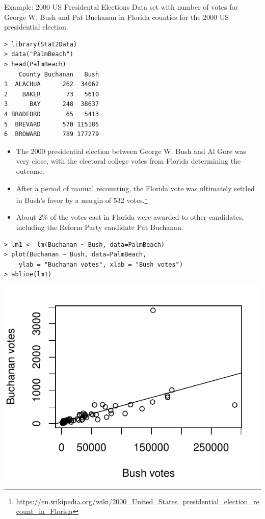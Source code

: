 \documentclass[10pt]{beamer}
\begin{document}
\begin{frame}[fragile]{Example: 2000 US Presidental Elections}
Data set with number of votes for George W. Bush and Pat Buchanan in Florida counties for the 2000 US presidential election.\\
\begin{verbatim}
> library(Stat2Data)
> data("PalmBeach")
> head(PalmBeach)
    County Buchanan   Bush
1  ALACHUA      262  34062
2    BAKER       73   5610
3      BAY      248  38637
4 BRADFORD       65   5413
5  BREVARD      570 115185
6  BROWARD      789 177279
\end{verbatim}
\end{frame}

\begin{frame}
\begin{itemize}
\item The 2000 presidential election between George W. Bush and Al Gore was very close, with the electoral college votes from Florida determining the outcome.
\vspace{10pt}
\item After a period of manual recounting, the Florida vote was ultimately settled in Bush's favor by a margin of 532 votes.\footnote{\url{https://en.wikipedia.org/wiki/2000_United_States_presidential_election_recount_in_Florida}}
\vspace{10pt}
\item About 2\% of the votes cast in Florida were awarded to other candidates, including the Reform Party candidate Pat Buchanan.
\end{itemize}
\end{frame}

\begin{frame}[fragile]
\begin{verbatim}
> lm1 <- lm(Buchanan ~ Bush, data=PalmBeach)
> plot(Buchanan ~ Bush, data=PalmBeach,
    ylab = "Buchanan votes", xlab = "Bush votes")
> abline(lm1)
\end{verbatim}
\begin{center}
\includegraphics[scale=0.7]{figure/election_plot.pdf}
\end{center}
\end{frame}
\end{document}
